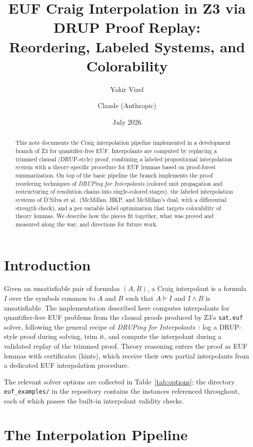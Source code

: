 \documentclass[11pt]{article}
\title{EUF Craig Interpolation in Z3 via DRUP Proof Replay:\\
Reordering, Labeled Systems, and Colorability}
\author{Yakir Vizel \and Claude (Anthropic)}
\date{July 2026}
\newcommand{\code}[1]{\texttt{#1}}
\begin{document}
\maketitle

\begin{abstract}
This note documents the Craig interpolation pipeline implemented in a
development branch of Z3 for quantifier-free EUF. Interpolants are computed
by replaying a trimmed clausal (DRUP-style) proof, combining a labeled
propositional interpolation system with a theory-specific procedure for EUF
lemmas based on proof-forest summarization. On top of the basic pipeline the
branch implements the proof reordering techniques of \emph{DRUPing for
Interpolants} (colored unit propagation and restructuring of resolution
chains into single-colored stages), the labeled interpolation systems of
D'Silva et al.\ (McMillan, HKP, and McMillan's dual, with a differential
strength check), and a per-variable label optimization that targets
colorability of theory lemmas. We describe how the pieces fit together,
what was proved and measured along the way, and directions for future work.
\end{abstract}

\section{Introduction}

Given an unsatisfiable pair of formulas $(A, B)$, a Craig interpolant is a
formula $I$ over the symbols common to $A$ and $B$ such that $A \models I$
and $I \wedge B$ is unsatisfiable. The implementation described here
computes interpolants for quantifier-free EUF problems from the clausal
proofs produced by Z3's \code{sat.euf} solver, following the general recipe
of \emph{DRUPing for Interpolants}~\cite{drup-itp}: log a DRUP-style proof
during solving, trim it, and compute the interpolant during a validated
replay of the trimmed proof. Theory reasoning enters the proof as EUF lemmas
with certificates (hints), which receive their own partial interpolants from
a dedicated EUF interpolation procedure.

The relevant solver options are collected in
Table~\ref{tab:options}; the directory \code{euf\_examples/} in the
repository contains the instances referenced throughout, each of which
passes the built-in interpolant validity checks.

\section{The Interpolation Pipeline}
\label{sec:pipeline}
\end{document}
